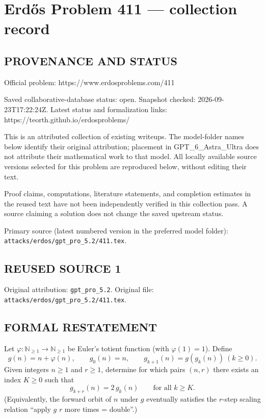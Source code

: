 \section*{Erd\H{o}s Problem 411 --- collection record}

\subsection*{PROVENANCE AND STATUS}
Official problem: https://www.erdosproblems.com/411

Saved collaborative-database status: open.
Snapshot checked: 2026-09-23T17:22:24Z.
Latest status and formalization links: https://teorth.github.io/erdosproblems/

This is an attributed collection of existing writeups. The model-folder names below identify their original attribution; placement in GPT\_6\_Astra\_Ultra does not attribute their mathematical work to that model. All locally available source versions selected for this problem are reproduced below, without editing their text.

Proof claims, computations, literature statements, and completion estimates in the reused text have not been independently verified in this collection pass. A source claiming a solution does not change the saved upstream status.

Primary source (latest numbered version in the preferred model folder): \texttt{attacks/erdos/gpt\_pro\_5.2/411.tex}.

\subsection*{REUSED SOURCE 1}
Original attribution: \texttt{gpt\_pro\_5.2}.
Original file: \texttt{attacks/erdos/gpt\_pro\_5.2/411.tex}.


\subsection*{FORMAL RESTATEMENT}
Let $\varphi:\mathbb{N}_{\ge 1}\to\mathbb{N}_{\ge 1}$ be Euler's totient function (with $\varphi(1)=1$). Define
\[
  g(n)=n+\varphi(n),\qquad g_0(n)=n,\qquad g_{k+1}(n)=g(g_k(n))\ (k\ge 0).
\]
Given integers $n\ge 1$ and $r\ge 1$, determine for which pairs $(n,r)$ there exists an index $K\ge 0$ such that
\[
  g_{k+r}(n)=2\,g_k(n)\qquad\text{for all }k\ge K.
\]
(Equivalently, the forward orbit of $n$ under $g$ eventually satisfies the $r$-step scaling relation ``apply $g$ $r$ more times = double''.)

